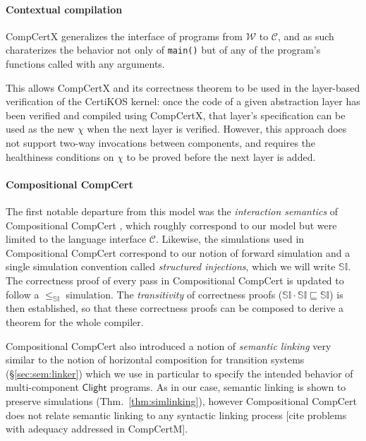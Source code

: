 \documentclass[sigplan,10pt,review,anonymous]{acmart}\settopmatter{printfolios=true,printccs=false,printacmref=false}
\newcommand{\kw}[1]{\ensuremath{ \mathsf{#1} }}
\begin{document}

\paragraph{Contextual compilation} %

CompCertX \cite{popl15} generalizes
the interface of programs
from $\mathcal{W}$ to $\mathcal{C}$,
and as such charaterizes the behavior
not only of \texttt{main()}
but of any of the program's functions
called with any arguments.

This allows CompCertX and its correctness theorem
to be used in the layer-based verification of
the CertiKOS kernel:
once the code of a given abstraction layer has been verified
and compiled using CompCertX,
that layer's specification can be used as the new $\chi$
when the next layer is verified.
However,
this approach does not support two-way invocations between components,
and requires the healthiness conditions on $\chi$
to be proved before the next layer is added.


\paragraph{Compositional CompCert} %

The first notable departure from this model
was the \emph{interaction semantics} of
Compositional CompCert \cite{compcompcert},
which roughly correspond to our model
but were limited to the language interface $\mathcal{C}$.
Likewise, the simulations used in Compositional CompCert
correspond to our notion of forward simulation
and a single simulation convention called \emph{structured injections},
which we will write $\mathbb{SI}$.
The correctness proof of every pass in Compositional CompCert
is updated to follow a $\le_\mathbb{SI}$ simulation.
The \emph{transitivity} of correctness proofs
($\mathbb{SI} \cdot \mathbb{SI} \sqsubseteq \mathbb{SI}$)
is then established,
so that these correctness proofs can be composed
to derive a theorem for the whole compiler.

Compositional CompCert also introduced a notion of \emph{semantic linking}
very similar to the notion of horizontal composition
for transition systems (\S\ref{sec:sem:linker})
which we use in particular to specify the intended behavior
of multi-component \kw{Clight} programs.
As in our case,
semantic linking is shown to preserve simulations
(Thm.~\ref{thm:simlinking}),
however Compositional CompCert
does not relate semantic linking to any
syntactic linking process
[cite problems with adequacy addressed in CompCertM].
\end{document}

